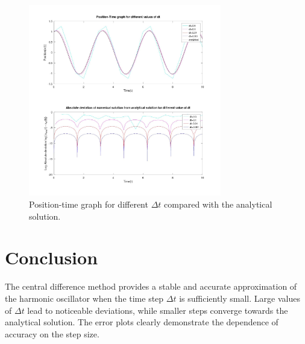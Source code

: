 \begin{figure}[h!]
    \centering
    \includegraphics[width=0.75\textwidth]{a3.jpg}
    \caption{Position-time graph for different $\Delta t$ compared with the analytical solution.}
\end{figure}

\section*{Conclusion}
The central difference method provides a stable and accurate approximation of the harmonic oscillator when the time step $\Delta t$ is sufficiently small. Large values of $\Delta t$ lead to noticeable deviations, while smaller steps converge towards the analytical solution. The error plots clearly demonstrate the dependence of accuracy on the step size.
